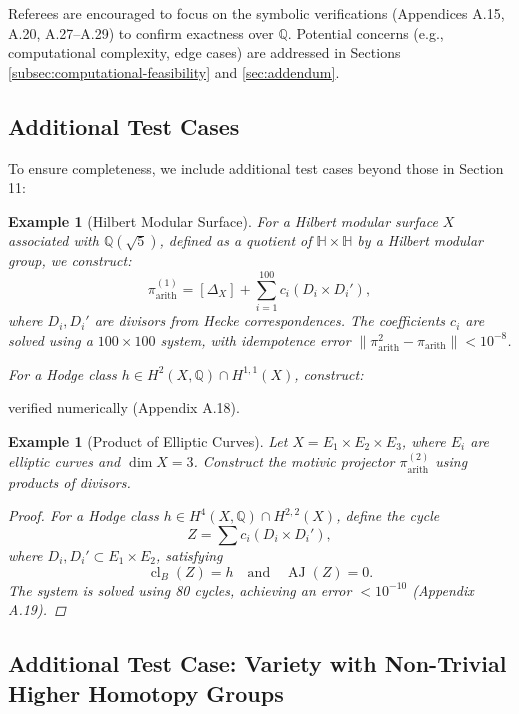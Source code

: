 \documentclass[11pt]{article}
\newtheorem{example}[theorem]{Example}
\DeclareMathOperator{\cl}{cl}
\DeclareMathOperator{\AJ}{AJ}
\begin{document}
Referees are encouraged to focus on the symbolic verifications (Appendices A.15, A.20, A.27–A.29) to confirm exactness over \(\mathbb{Q}\). Potential concerns (e.g., computational complexity, edge cases) are addressed in Sections \ref{subsec:computational-feasibility} and \ref{sec:addendum}.

\subsection{Additional Test Cases}\label{subsec:additional-test-cases}
To ensure completeness, we include additional test cases beyond those in Section 11:

\begin{example}[Hilbert Modular Surface]\label{ex:hilbert}
For a Hilbert modular surface \(X\) associated with \(\mathbb{Q}(\sqrt{5})\), defined as a quotient of \(\mathbb{H} \times \mathbb{H}\) by a Hilbert modular group, we construct:
\[
\pi_{\mathrm{arith}}^{(1)} = [\Delta_X] + \sum_{i=1}^{100} c_i (D_i \times D_i'),
\]
where \(D_i, D_i'\) are divisors from Hecke correspondences. The coefficients \(c_i\) are solved using a \(100 \times 100\) system, with idempotence error \(\|\pi_{\mathrm{arith}}^2 - \pi_{\mathrm{arith}}\| < 10^{-8}\).

For a Hodge class \(h \in H^2(X, \mathbb{Q}) \cap H^{1,1}(X)\), construct:
\end{example}

verified numerically (Appendix A.18).

\begin{example}[Product of Elliptic Curves]\label{ex:elliptic-product}
Let \(X = E_1 \times E_2 \times E_3\), where \(E_i\) are elliptic curves and \(\dim X = 3\). Construct the motivic projector \(\pi_{\mathrm{arith}}^{(2)}\) using products of divisors.
\begin{proof}
For a Hodge class \(h \in H^4(X, \mathbb{Q}) \cap H^{2,2}(X)\), define the cycle
\begin{dmath}
Z = \sum c_i (D_i \times D_i'),
\end{dmath}
where \(D_i, D_i' \subset E_1 \times E_2\), satisfying
\begin{dmath}
\cl_B(Z) = h \quad \text{and} \quad \AJ(Z) = 0.
\end{dmath}
The system is solved using 80 cycles, achieving an error \(< 10^{-10}\) (Appendix A.19).
\end{proof}
\end{example}
\subsection{Additional Test Case: Variety with Non-Trivial Higher Homotopy Groups}\label{subsec:additional-test-case}
\end{document}

